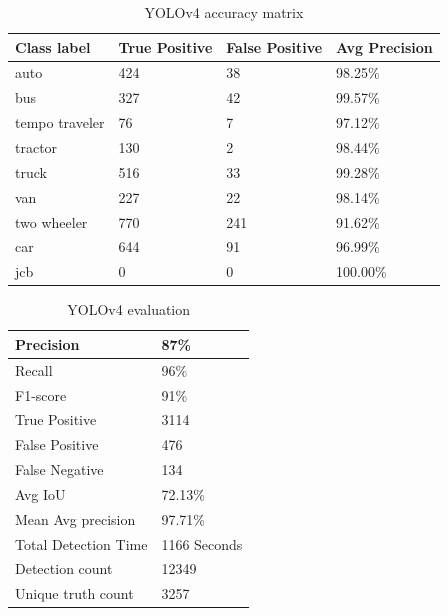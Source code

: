 \begin{table}[!ht]
	\centering
	\begin{tabular}{|l|l|l|l|}
		\hline
		Class label    & True Positive & False Positive & Avg Precision \\ \hline
		auto           & 424           & 38             & 98.25\%       \\ \hline
		bus            & 327           & 42             & 99.57\%       \\ \hline
		tempo traveler & 76            & 7              & 97.12\%       \\ \hline
		tractor        & 130           & 2              & 98.44\%       \\ \hline
		truck          & 516           & 33             & 99.28\%       \\ \hline
		van            & 227           & 22             & 98.14\%       \\ \hline
		two wheeler    & 770           & 241            & 91.62\%       \\ \hline
		car            & 644           & 91             & 96.99\%       \\ \hline
		jcb            & 0             & 0              & 100.00\%      \\ \hline
	\end{tabular}
	\caption{YOLOv4 accuracy matrix}
	\label{tab:yolo_matrix}
\end{table}

\begin{table}[!ht]
	\centering
	\begin{tabular}{|l|l|}
		\hline
		Precision            & 87\%    \\ \hline
		Recall               & 96\%    \\ \hline
		F1-score             & 91\%    \\ \hline
		True Positive        & 3114    \\ \hline
		False Positive       & 476     \\ \hline
		False Negative       & 134     \\ \hline
		Avg IoU              & 72.13\% \\ \hline
		Mean Avg precision   & 97.71\% \\ \hline
		Total Detection Time & 1166 Seconds \\ \hline
		Detection count      & 12349 \\ \hline
		Unique truth count   & 3257 \\ \hline
	\end{tabular}
	\caption{YOLOv4 evaluation}
	\label{tag:yolo_score}
\end{table}

